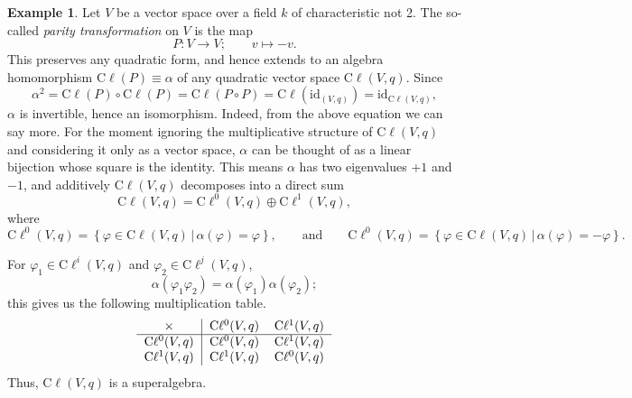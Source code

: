 \documentclass[a4paper]{report}
\newcommand{\cliff}{\mathrm{C}\ell}
\theoremstyle{definition}
\newtheorem{example}{Example}[section]
\theoremstyle{plain}
\theoremstyle{remark}
\begin{document}
\begin{example}
  Let $V$ be a vector space over a field $k$ of characteristic not 2. The so-called \emph{parity transformation} on $V$ is the map
  \begin{equation*}
    P\colon V \to V;\qquad v \mapsto -v.
  \end{equation*}
  This preserves any quadratic form, and hence extends to an algebra homomorphism $\cliff(P) \equiv \alpha$ of any quadratic vector space $\cliff(V,q)$. Since 
  \begin{equation*}
    \alpha^2 = \cliff(P) \circ \cliff(P) = \cliff(P \circ P) = \cliff(\mathrm{id}_{(V,q)}) = \mathrm{id}_{\cliff(V,q)},
  \end{equation*}
  $\alpha$ is invertible, hence an isomorphism. Indeed, from the above equation we can say more. For the moment ignoring the multiplicative structure of $\cliff(V,q)$ and considering it only as a vector space, $\alpha$ can be thought of as a linear bijection whose square is the identity. This means $\alpha$ has two eigenvalues $+1$ and $-1$, and additively $\cliff(V,q)$ decomposes into a direct sum
  \begin{equation*}
    \cliff(V,q) = \cliff^{0}(V,q) \oplus \cliff^{1}(V,q),
  \end{equation*}
  where 
  \begin{equation*}
    \cliff^{0}(V,q) = \left\{ \varphi \in \cliff(V,q)\,\big|\, \alpha(\varphi) = \varphi \right\},\qquad\text{and} \qquad\cliff^{0}(V,q) = \left\{ \varphi \in \cliff(V,q)\,\big|\, \alpha(\varphi) = -\varphi \right\}.
  \end{equation*}

  For $\varphi_{1} \in \cliff^{i}(V,q)$ and $\varphi_{2} \in \cliff^{j}(V,q)$,
  \begin{equation*}
    \alpha(\varphi_{1}\varphi_{2}) = \alpha(\varphi_{1})\alpha(\varphi_{2});
  \end{equation*}
  this gives us the following multiplication table.
  \begin{equation*}
    \begin{tabular}[c]{c | c c}
      $\times$ & $\cliff^{0}(V,q)$ & $\cliff^{1}(V,q)$ \\
      \hline
      $\cliff^{0}(V,q)$ & $\cliff^{0}(V,q)$ & $\cliff^{1}(V,q)$\\
      $\cliff^{1}(V,q)$ & $\cliff^{1}(V,q)$ & $\cliff^{0}(V,q)$\\
    \end{tabular}
  \end{equation*}
  Thus, $\cliff(V,q)$ is a superalgebra.

\end{example}
\end{document}
